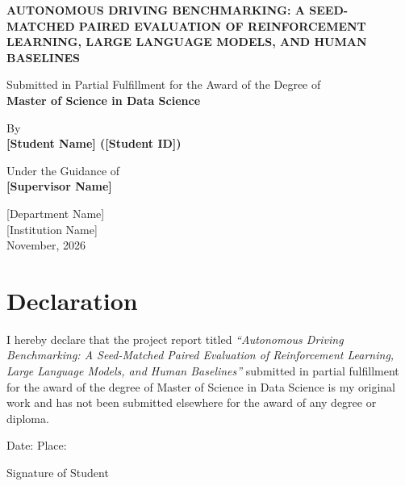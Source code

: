 \documentclass[12pt,a4paper]{report}
\begin{document}

\begin{titlepage}
\centering\vspace*{1cm}
{\fontsize{16}{20}\bfseries\MakeUppercase{Autonomous Driving Benchmarking: A Seed-Matched Paired Evaluation of Reinforcement Learning, Large Language Models, and Human Baselines}\par}
\vspace{2cm}
{\large Submitted in Partial Fulfillment for the Award of the Degree of\\[0.5em]
\textbf{Master of Science in Data Science}\par}
\vspace{2cm}
{\large By\\[0.5em]\textbf{[Student Name] ([Student ID])}\par}
\vspace{2cm}
{\large Under the Guidance of\\[0.5em]\textbf{[Supervisor Name]}\par}
\vspace{2cm}
{\large [Department Name]\\[0.5em][Institution Name]\\[0.5em]November, 2026\par}
\end{titlepage}

\chapter*{Declaration}

I hereby declare that the project report titled \textit{``Autonomous Driving Benchmarking: A Seed-Matched Paired Evaluation of Reinforcement Learning, Large Language Models, and Human Baselines''} submitted in partial fulfillment for the award of the degree of Master of Science in Data Science is my original work and has not been submitted elsewhere for the award of any degree or diploma.

\vspace{2cm}
\noindent Date:\underline{\hspace{4cm}} \hfill Place:\underline{\hspace{4cm}}

\vspace{2cm}
\noindent\hfill Signature of Student\hspace{2cm}
\clearpage
\end{document}
